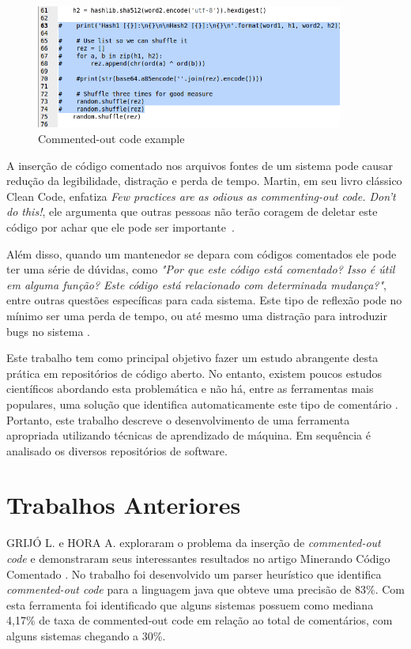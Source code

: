 \documentclass[12pt]{article}
\begin{document}
\begin{figure}[ht]
  \centering
  \includegraphics[width=0.9\textwidth]{../images/gcc06.png}
  \caption{Commented-out code example }
  \label{fig:commentExample}
\end{figure}


A inserção de código comentado nos arquivos fontes de um sistema pode causar
redução da legibilidade, distração e perda de tempo. Martin, em seu livro clássico
Clean Code, enfatiza \textit{Few practices are as odious as commenting-out code. 
Don’t do this!}, ele argumenta que outras pessoas não terão coragem de deletar 
este código por achar que ele pode ser importante~\cite{cleanCode}. 

Além disso, quando um mantenedor se depara com códigos comentados ele pode ter uma 
série de dúvidas, como \textit{"Por que este código está comentado? Isso é útil em 
alguma função? Este código está relacionado com determinada mudança?"}, entre outras 
questões específicas para cada sistema. Este tipo de reflexão pode no mínimo ser 
uma perda de tempo, ou até mesmo uma distração para introduzir bugs no sistema \cite{cleanCode}.

Este trabalho tem como principal objetivo fazer um estudo abrangente desta prática em repositórios 
de código aberto. No entanto, existem poucos estudos científicos abordando esta problemática e não 
há, entre as ferramentas mais populares, uma solução que identifica automaticamente
este tipo de comentário \cite{articleMiningComments}. Portanto, este trabalho descreve o
desenvolvimento de uma ferramenta apropriada utilizando técnicas de aprendizado de 
máquina. Em sequência é analisado os diversos repositórios de software. 

\section{Trabalhos Anteriores} \label{sec:prev-works}
GRIJÓ L. e HORA A. exploraram o problema da inserção de \textit{commented-out code}
e demonstraram seus interessantes resultados no artigo Minerando Código Comentado 
\cite{articleMiningComments}. No trabalho foi desenvolvido um parser heurístico
que identifica \textit{commented-out code} para a linguagem java que obteve
uma precisão de 83\%. Com esta ferramenta foi identificado que alguns 
sistemas possuem como mediana 4,17\% de taxa de commented-out code em relação
ao total de comentários, com alguns sistemas chegando a 30\%.
\end{document}
